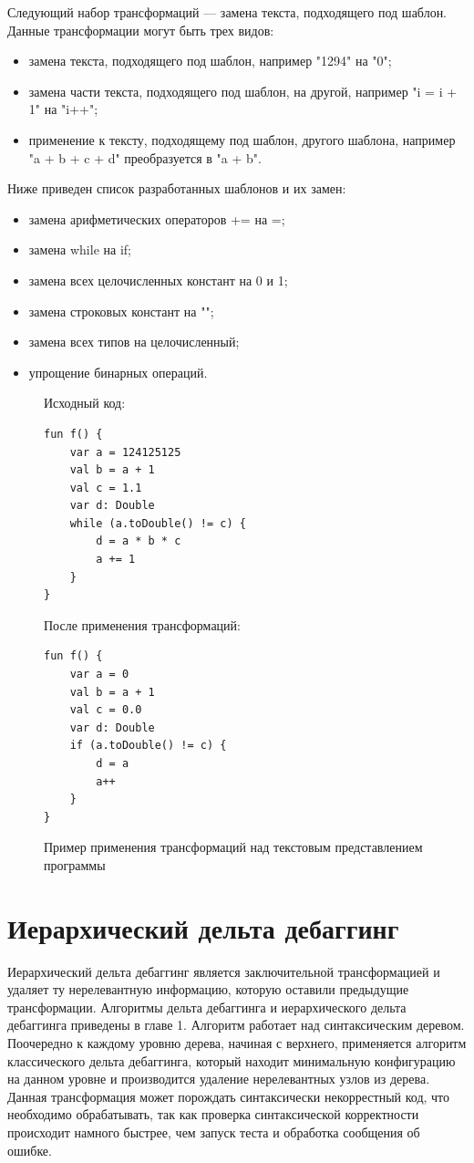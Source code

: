 Следующий набор трансформаций --- замена текста, подходящего под шаблон. Данные трансформации могут быть трех видов:
\begin{itemize}
	\item замена текста, подходящего под шаблон, например "1294" на "0"; 
	\item замена части текста, подходящего под шаблон, на другой, например "i = i + 1" на "i++";
	\item применение к тексту, подходящему под шаблон, другого шаблона, например "a + b + c + d" преобразуется в "a + b".
\end{itemize}
Ниже приведен список разработанных шаблонов и их замен:
\begin{itemize}
	\item замена арифметических операторов += на =;
	\item замена while на if;
	\item замена всех целочисленных констант на 0 и 1;
	\item замена строковых констант на "";
	\item замена всех типов на целочисленный;
	\item упрощение бинарных операций.
\end{itemize}
\begin{figure}
Исходный код:
\begin{lstlisting}
fun f() {
    var a = 124125125
    val b = a + 1
    val c = 1.1
    var d: Double
    while (a.toDouble() != c) {
        d = a * b * c
        a += 1
    }
}
\end{lstlisting}
После применения трансформаций:
\begin{lstlisting}
fun f() {
    var a = 0
    val b = a + 1
    val c = 0.0
    var d: Double
    if (a.toDouble() != c) {
        d = a
        a++
    }
}
\end{lstlisting}
\caption{\label{ex:peephole}Пример применения трансформаций над текстовым представлением программы}
\end{figure}


\section{Иерархический дельта дебаггинг}
Иерархический дельта дебаггинг является заключительной трансформацией и удаляет ту нерелевантную информацию, которую оставили предыдущие трансформации. Алгоритмы дельта дебаггинга и иерархического дельта дебаггинга приведены в главе 1. Алгоритм работает над синтаксическим деревом. Поочередно к каждому уровню дерева, начиная с верхнего, применяется алгоритм классического дельта дебаггинга, который находит минимальную конфигурацию на данном уровне и производится удаление нерелевантных узлов из дерева. Данная трансформация может порождать синтаксически некоррестный код, что необходимо обрабатывать, так как проверка синтаксической корректности происходит намного быстрее, чем запуск теста и обработка сообщения об ошибке.